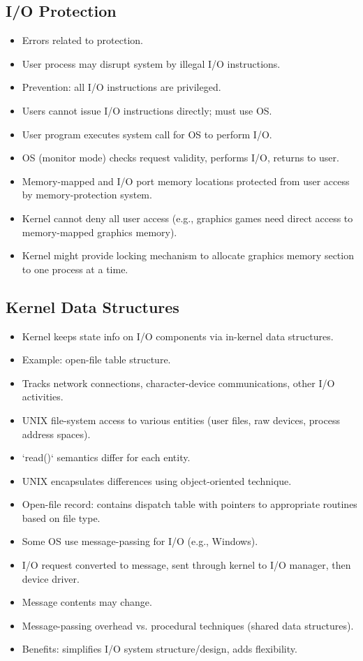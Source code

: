 \subsection{I/O Protection}
\begin{itemize}
    \item Errors related to protection.
    \item User process may disrupt system by illegal I/O instructions.
    \item Prevention: all I/O instructions are privileged.
    \item Users cannot issue I/O instructions directly; must use OS.
    \item User program executes system call for OS to perform I/O.
    \item OS (monitor mode) checks request validity, performs I/O, returns to user.
    \item Memory-mapped and I/O port memory locations protected from user access by memory-protection system.
    \item Kernel cannot deny all user access (e.g., graphics games need direct access to memory-mapped graphics memory).
    \item Kernel might provide locking mechanism to allocate graphics memory section to one process at a time.
\end{itemize}

\subsection{Kernel Data Structures}
\begin{itemize}
    \item Kernel keeps state info on I/O components via in-kernel data structures.
    \item Example: open-file table structure.
    \item Tracks network connections, character-device communications, other I/O activities.
    \item UNIX file-system access to various entities (user files, raw devices, process address spaces).
    \item `read()` semantics differ for each entity.
    \item UNIX encapsulates differences using object-oriented technique.
    \item Open-file record: contains dispatch table with pointers to appropriate routines based on file type.
    \item Some OS use message-passing for I/O (e.g., Windows).
    \item I/O request converted to message, sent through kernel to I/O manager, then device driver.
    \item Message contents may change.
    \item Message-passing overhead vs. procedural techniques (shared data structures).
    \item Benefits: simplifies I/O system structure/design, adds flexibility.
\end{itemize}

